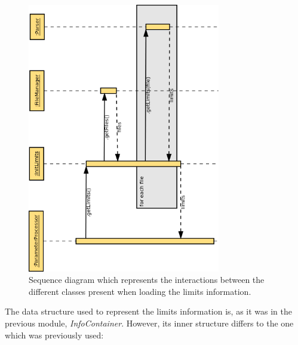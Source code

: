 \begin{figure}[H]
\centerline{\includegraphics[width=0.75\textwidth]{images/InitLimitsSequence.png}}
\caption{Sequence diagram which represents the interactions between the different classes present when loading the limits information.}
\label{f5.9}
\end{figure}
\pagebreak
The data structure used to represent the limits information is, as it was in the previous module, \emph{InfoContainer}. However, its inner structure differs to the one which was previously used:

